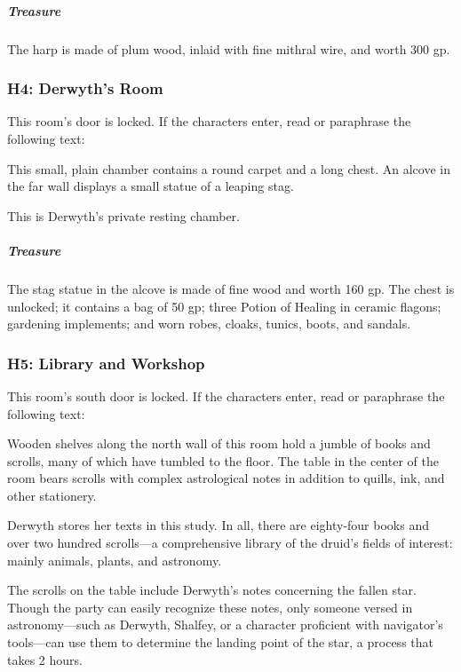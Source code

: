 \documentclass[10pt,a4paper,twoside,bg=print,twocolumn,openany,nodeprecatedcode]{dndbook}
\begin{document}
\subparagraph{Treasure}
The harp is made of plum wood, inlaid with fine mithral wire, and worth 300 gp.

\subsubsection{H4: Derwyth's Room}
This room's door is locked. If the characters enter, read or paraphrase the following text:

\begin{DndReadAloud}{}
This small, plain chamber contains a round carpet and a long chest. An alcove in the far wall displays a small statue of a leaping stag.

\end{DndReadAloud}

This is Derwyth's private resting chamber.

\subparagraph{Treasure}
The stag statue in the alcove is made of fine wood and worth 160 gp. The chest is unlocked; it contains a bag of 50 gp; three Potion of Healing in ceramic flagons; gardening implements; and worn robes, cloaks, tunics, boots, and sandals.

\subsubsection{H5: Library and Workshop}
This room's south door is locked. If the characters enter, read or paraphrase the following text:

\begin{DndReadAloud}{}
Wooden shelves along the north wall of this room hold a jumble of books and scrolls, many of which have tumbled to the floor. The table in the center of the room bears scrolls with complex astrological notes in addition to quills, ink, and other stationery.

\end{DndReadAloud}

Derwyth stores her texts in this study. In all, there are eighty-four books and over two hundred scrolls—a comprehensive library of the druid's fields of interest: mainly animals, plants, and astronomy.

The scrolls on the table include Derwyth's notes concerning the fallen star. Though the party can easily recognize these notes, only someone versed in astronomy—such as Derwyth, Shalfey, or a character proficient with navigator's tools—can use them to determine the landing point of the star, a process that takes 2 hours.
\end{document}
